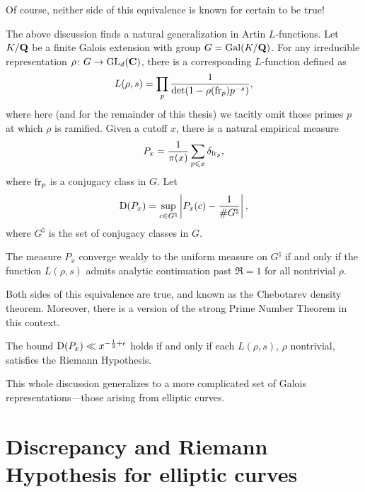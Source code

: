 Of course, neither side of this equivalence is known for certain to be true! 

The above discussion finds a natural generalization in Artin $L$-functions. 
Let $K/\mathbf{Q}$ be a finite Galois extension with group $G=\operatorname{Gal}(K/\mathbf{Q})$. For any 
irreducible representation $\rho\colon G\to \operatorname{GL}_d(\mathbf{C})$, there is a 
corresponding $L$-function defined as 
\[
	L(\rho,s) = \prod_p \frac{1}{\det(1-\rho(\mathrm{fr}_p) p^{-s})} ,
\]
where here (and for the remainder of this thesis) we tacitly omit those primes 
$p$ at which $\rho$ is ramified. Given a cutoff $x$, there is a natural 
empirical measure 
\[
	P_x = \frac{1}{\pi(x)} \sum_{p\leqslant x} \delta_{\mathrm{fr}_p} ,
\]
where $\mathrm{fr}_p$ is a conjugacy class in $G$. Let 
\[
	\operatorname{D}(P_x) = \sup_{c\in G^\natural} \left| P_x(c) - \frac{1}{\# G^\natural}\right|,
\]
where $G^\natural$ is the set of conjugacy classes in $G$. 

\begin{theorem}
The measure $P_x$ converge weakly to the uniform measure on $G^\natural$ if and 
only if the function $L(\rho,s)$ admits analytic continuation past $\Re =1$ for 
all nontrivial $\rho$. 
\end{theorem}

Both sides of this equivalence are true, and known as the Chebotarev density 
theorem. Moreover, there is a version of the strong Prime Number Theorem in 
this context. 

\begin{theorem}
The bound $\operatorname{D}(P_x) \ll x^{-\frac 1 2+\epsilon}$ holds if and only if each
$L(\rho,s)$, $\rho$ nontrivial, satisfies the Riemann Hypothesis. 
\end{theorem}

This whole discussion generalizes to a more complicated set of Galois 
representations---those arising from elliptic curves. 





\section{Discrepancy and Riemann Hypothesis for elliptic curves}

